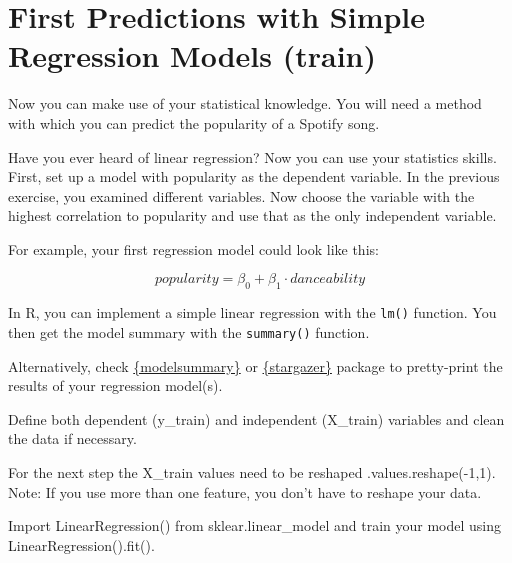 \documentclass[
  11pt,
]{book}
\newenvironment{tips}[1]
  {
  \begin{itemize}
  \footnotesize
  \renewcommand{\labelitemi}{
    \raisebox{-.7\height}[0pt][0pt]{
      {\setkeys{Gin}{width=3em,keepaspectratio}
        \texttt{[image: images/\#1.png]}}
    }
  }
  \setlength{\fboxsep}{1em}
  \begin{rbox}
  \item
  }
  {
  \end{rbox}
  \end{itemize}
  }
\newenvironment{tipsp}[1]
  {
  \begin{itemize}
  \footnotesize
  \renewcommand{\labelitemi}{
    \raisebox{-.7\height}[0pt][0pt]{
      {\setkeys{Gin}{width=3em,keepaspectratio}
        \texttt{[image: images/\#1.png]}}
    }
  }
  \setlength{\fboxsep}{1em}
  \begin{pbox}
  \item
  }
  {
  \end{pbox}
  \end{itemize}
  }
\begin{document}
\hypertarget{first-predictions-with-simple-regression-models-train}{%
\section{First Predictions with Simple Regression Models (train)}\label{first-predictions-with-simple-regression-models-train}}

Now you can make use of your statistical knowledge. You will need a method with which you can predict the popularity of a Spotify song.

Have you ever heard of linear regression? Now you can use your statistics skills. First, set up a model with popularity as the dependent variable. In the previous exercise, you examined different variables. Now choose the variable with the highest correlation to popularity and use that as the only independent variable.

For example, your first regression model could look like this:

\[ popularity = \beta_0 + \beta_1 \cdot danceability \]

\begin{tips}r

In R, you can implement a simple linear regression with the \texttt{lm()} function. You then get the model summary with the \texttt{summary()} function.

Alternatively, check \href{https://vincentarelbundock.github.io/modelsummary/}{\{modelsummary\}} or \href{https://www.jakeruss.com/cheatsheets/stargazer/}{\{stargazer\}} package to pretty-print the results of your regression model(s).

Define both dependent (y\_train) and independent (X\_train) variables and clean the data if necessary.

\end{tips}

\begin{tipsp}p

For the next step the X\_train values need to be reshaped .values.reshape(-1,1). Note: If you use more than one feature, you don't have to reshape your data.

Import LinearRegression() from sklear.linear\_model and train your model using LinearRegression().fit().

\end{tipsp}
\end{document}
